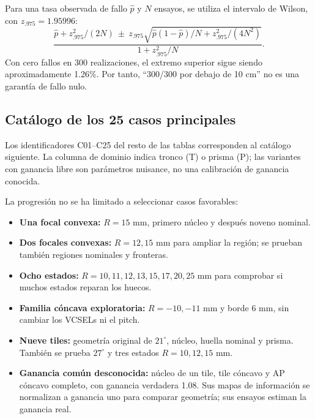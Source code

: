 Para una tasa observada de fallo $\hat p$ y $N$ ensayos, se utiliza el intervalo de Wilson, con $z_{.975}=1.95996$:
\begin{equation}
\frac{\hat p+z_{.975}^2/(2N)\ \pm\ z_{.975}\sqrt{\hat p(1-\hat p)/N+z_{.975}^2/(4N^2)}}{1+z_{.975}^2/N}.
\end{equation}
Con cero fallos en 300 realizaciones, el extremo superior sigue siendo aproximadamente 1.26\%. Por tanto, ``300/300 por debajo de 10 cm'' no es una garantía de fallo nulo.

\subsection{Catálogo de los 25 casos principales}
Los identificadores C01--C25 del resto de las tablas corresponden al catálogo siguiente. La columna de dominio indica tronco (T) o prisma (P); las variantes con ganancia libre son parámetros nuisance, no una calibración de ganancia conocida.


La progresión no se ha limitado a seleccionar casos favorables:
\begin{itemize}
\item \textbf{Una focal convexa:} $R=15$ mm, primero núcleo y después noveno nominal.
\item \textbf{Dos focales convexas:} $R=12,15$ mm para ampliar la región; se prueban también regiones nominales y fronteras.
\item \textbf{Ocho estados:} $R=10,11,12,13,15,17,20,25$ mm para comprobar si muchos estados reparan los huecos.
\item \textbf{Familia cóncava exploratoria:} $R=-10,-11$ mm y borde 6 mm, sin cambiar los VCSELs ni el pitch.
\item \textbf{Nueve tiles:} geometría original de $21^\circ$, núcleo, huella nominal y prisma. También se prueba $27^\circ$ y tres estados $R=10,12,15$ mm.
\item \textbf{Ganancia común desconocida:} núcleo de un tile, tile cóncavo y AP cóncavo completo, con ganancia verdadera 1.08. Sus mapas de información se normalizan a ganancia uno para comparar geometría; sus ensayos estiman la ganancia real.
\end{itemize}

